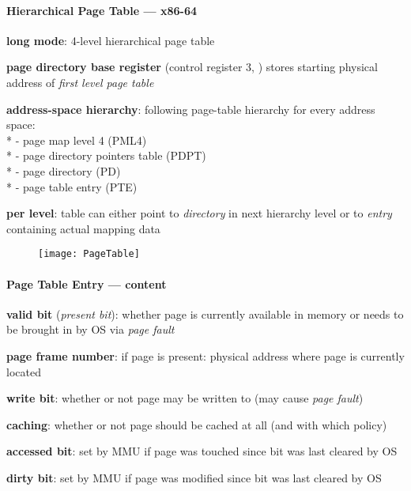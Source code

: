 \paragraph{Hierarchical Page Table --- x86-64}
\begin{items}
  \item \textbf{long mode}: 4-level hierarchical page table
  \item \textbf{page directory base register} (control register 3, ) stores starting physical address of \emph{first level page table}
  \item \textbf{address-space hierarchy}: following page-table hierarchy for every address space: \\*
    - page map level 4 (PML4) \\*
    - page directory pointers table (PDPT) \\*
    - page directory (PD) \\*
    - page table entry (PTE)
  \item \textbf{per level}: table can either point to \emph{directory} in next hierarchy level or to \emph{entry} containing actual mapping data
\end{items}
\begin{figure}[H]\centering\label{PageTable}\texttt{[image: PageTable]}\end{figure}

\paragraph{Page Table Entry --- content}
\begin{items}
  \item \textbf{valid bit} (\emph{present bit}): whether page is currently available in memory or needs to be brought in by OS via \emph{page fault}
  \item \textbf{page frame number}: if page is present: physical address where page is currently located
  \item \textbf{write bit}: whether or not page may be written to (may cause \emph{page fault})
  \item \textbf{caching}: whether or not page should be cached at all (and with which policy)
  \item \textbf{accessed bit}: set by MMU if page was touched since bit was last cleared by OS
  \item \textbf{dirty bit}: set by MMU if page was modified since bit was last cleared by OS
\end{items}

